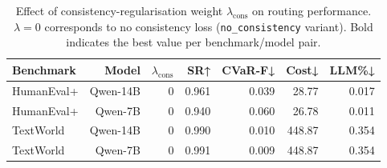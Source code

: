 \begin{table}[t]
\centering
\caption{Effect of consistency-regularisation weight $\lambda_{\mathrm{cons}}$ on routing performance.  $\lambda=0$ corresponds to no consistency loss (\texttt{no\_consistency} variant).  Bold indicates the best value per benchmark/model pair.}
\label{tab:lambda-ablation}
\begin{tabular}{lrrrrrr}
\hline
Benchmark & Model & $\lambda_{\mathrm{cons}}$ & SR↑ & CVaR-F↓ & Cost↓ & LLM\%↓ \\
\hline
HumanEval+ & Qwen-14B & 0 & 0.961 & 0.039 & 28.77 & 0.017 \\
HumanEval+ & Qwen-7B & 0 & 0.940 & 0.060 & 26.78 & 0.011 \\
TextWorld & Qwen-14B & 0 & 0.990 & 0.010 & 448.87 & 0.354 \\
TextWorld & Qwen-7B & 0 & 0.991 & 0.009 & 448.87 & 0.354 \\
\hline
\end{tabular}
\end{table}
